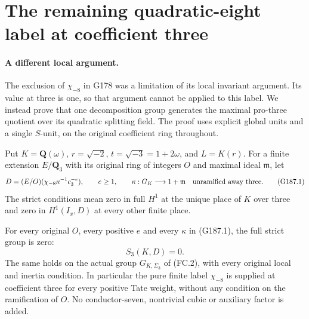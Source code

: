 \section{The remaining quadratic-eight label at coefficient three}
\label{sec:coefficient-three-negative8-strict}

\paragraph{A different local argument.}
The exclusion of $\chi_{-8}$ in G178 was a limitation of its local
invariant argument.  Its value at three is one, so that argument cannot
be applied to this label.  We instead prove that one decomposition
group generates the maximal pro-three quotient over its quadratic
splitting field.  The proof uses explicit global units and a single
$S$-unit, on the original coefficient ring throughout.

Put $K=\mathbf Q(\omega)$, $r=\sqrt{-2}$, $t=\sqrt{-3}=1+2\omega$,
and $L=K(r)$.  For a finite extension $E/\mathbf Q_3$ with its original
ring of integers $O$ and maximal ideal $\mathfrak m$, let
\[
 D=(E/O)(\chi_{-8}\kappa^{-1}c_3^{-e}),
 \qquad e\geq1,\qquad
 \kappa:G_K\longrightarrow1+\mathfrak m
 \quad\hbox{unramified away three}.
 \tag{G187.1}
\]
The strict conditions mean zero in full $H^1$ at the unique place of
$K$ over three and zero in $H^1(I_x,D)$ at every other finite place.

\begin{theorem}
\label{AC-G187}
For every original $O$, every positive $e$ and every $\kappa$ in
(G187.1), the full strict group is zero:
\[
                         S_3(K,D)=0.                 \tag{G187.2}
\]
The same holds on the actual group $G_{K,\Sigma_3}$ of (FC.2), with
every original local and inertia condition.  In particular the pure
finite label $\chi_{-8}$ is supplied at coefficient three for every
positive Tate weight, without any condition on the ramification of $O$.
No conductor-seven, nontrivial cubic or auxiliary factor is added.
\end{theorem}

